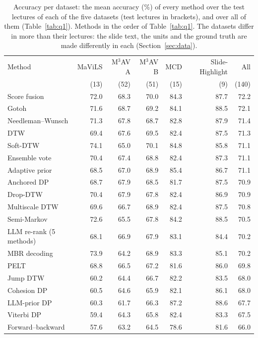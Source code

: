 \begin{table}[t]
\centering
\setlength{\tabcolsep}{4pt}
\caption{Accuracy per dataset: the mean accuracy (\%) of every method over the test lectures of each of the five datasets (test lectures in brackets), and over all of them (Table~\ref{tab:q1}). Methods in the order of Table~\ref{tab:q1}. The datasets differ in more than their lectures: the slide text, the units and the ground truth are made differently in each (Section~\ref{sec:data}).}
\label{tab:datasets}
\begin{tabular*}{\linewidth}{@{\extracolsep{\fill}}lrrrrrr@{}}
\toprule
Method & MaViLS & M$^3$AV A & M$^3$AV B & MCD & Slide-Highlight & All \\
 & (13) & (52) & (51) & (15) & (9) & (140) \\
\midrule
Score fusion & 72.0 & 68.3 & 70.0 & 84.3 & 87.7 & 72.2 \\
Gotoh & 71.6 & 68.7 & 69.2 & 84.1 & 88.5 & 72.1 \\
Needleman--Wunsch & 71.3 & 67.8 & 68.7 & 82.8 & 87.9 & 71.4 \\
DTW & 69.4 & 67.6 & 69.5 & 82.4 & 87.5 & 71.3 \\
Soft-DTW & 74.1 & 65.0 & 70.1 & 84.8 & 85.8 & 71.1 \\
Ensemble vote & 70.4 & 67.4 & 68.8 & 82.4 & 87.3 & 71.1 \\
Adaptive prior & 68.5 & 67.0 & 68.9 & 85.4 & 86.7 & 71.1 \\
Anchored DP & 68.7 & 67.9 & 68.5 & 81.7 & 87.5 & 70.9 \\
Drop-DTW & 70.4 & 67.9 & 67.8 & 82.4 & 86.9 & 70.9 \\
Multiscale DTW & 69.6 & 66.7 & 68.9 & 82.4 & 87.5 & 70.8 \\
Semi-Markov & 72.6 & 65.5 & 67.8 & 84.2 & 88.5 & 70.5 \\
LLM re-rank (5 methods) & 68.1 & 66.9 & 67.9 & 83.1 & 84.4 & 70.2 \\
MBR decoding & 73.9 & 64.2 & 68.9 & 83.3 & 85.1 & 70.2 \\
PELT & 68.8 & 66.5 & 67.2 & 81.6 & 86.0 & 69.8 \\
Jump DTW & 60.2 & 64.4 & 66.7 & 82.2 & 83.5 & 68.0 \\
Cohesion DP & 60.5 & 64.6 & 65.9 & 82.1 & 86.1 & 68.0 \\
LLM-prior DP & 60.3 & 61.7 & 66.3 & 87.2 & 88.6 & 67.7 \\
Viterbi DP & 59.4 & 64.3 & 65.8 & 82.4 & 83.3 & 67.5 \\
Forward--backward & 57.6 & 63.2 & 64.5 & 78.6 & 81.6 & 66.0 \\

\end{tabular*}
\end{table}
